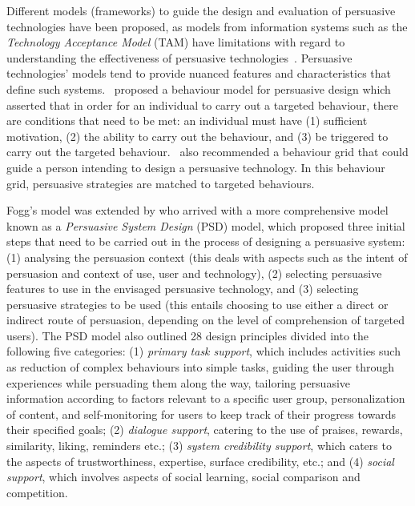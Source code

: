 Different models (frameworks) to guide the design and evaluation of persuasive technologies have been proposed, as models from information systems such as the \emph{Technology Acceptance Model} (TAM) have limitations with regard to understanding the effectiveness of persuasive technologies~\citep{Oinas-kukkonen:psd}. Persuasive technologies' models tend to provide nuanced features and characteristics that define such systems.~\cite{fogg2009behavior} proposed a behaviour model for persuasive design which asserted that in order for an individual to carry out a targeted behaviour, there are conditions that need to be met: an individual must have (1) sufficient motivation, (2) the ability to carry out the behaviour, and (3) be triggered to carry out the targeted behaviour.~\cite{fogg2009behavior2} also recommended a behaviour grid that could guide a person intending to design a persuasive technology. In this behaviour grid, persuasive strategies are matched to targeted behaviours. 

Fogg's model\citep{fogg2009behavior} was extended by \cite{Oinas-kukkonen:psd} who arrived with a more comprehensive model known as a \emph{Persuasive System Design} (PSD) model, which proposed three initial steps that need to be carried out in the process of designing a persuasive system: (1) analysing the persuasion context (this deals with aspects such as the intent of persuasion and context of use, user and technology), (2) selecting persuasive features to use in the envisaged persuasive technology, and (3) selecting persuasive strategies to be used (this entails choosing to use either a direct or indirect route of persuasion, depending on the level of comprehension of targeted users). The PSD model also outlined 28 design principles divided into the following five categories: (1) \emph{primary task support}, which includes activities such as reduction of complex behaviours into simple tasks, guiding the user through experiences while persuading them along the way, tailoring persuasive information according to factors relevant to a specific user group, personalization of content, and self-monitoring for users to keep track of their progress towards their specified goals; (2) \emph{dialogue support}, catering to the use of praises, rewards, similarity, liking, reminders etc.; (3) \emph{system credibility support}, which caters to the aspects of trustworthiness, expertise, surface credibility, etc.; and (4) \emph{social support}, which involves aspects of social learning, social comparison and competition.

